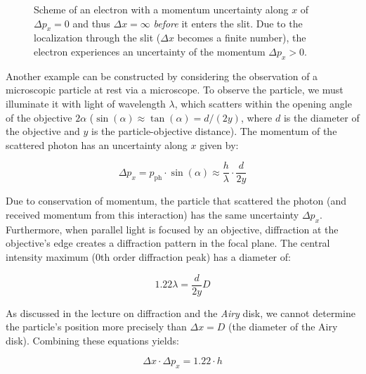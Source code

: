 \documentclass[
  a4paper,
]{book}
\begin{document}
\begin{tcolorbox}
\begin{figure}[H]
{}

\caption{Scheme of an electron with a momentum uncertainty along \(x\)
of \(\Delta p_x = 0\) and thus \(\Delta x = \infty\) \emph{before} it
enters the slit. Due to the localization through the slit (\(\Delta x\)
becomes a finite number), the electron experiences an uncertainty of the
momentum \(\Delta p_x > 0\).}

\end{figure}%

\end{tcolorbox}

\begin{tcolorbox}[enhanced jigsaw, coltitle=black, title=\textcolor{quarto-callout-note-color}{\faInfo}\hspace{0.5em}{Example: Uncertainty in a microscope}, colframe=quarto-callout-note-color-frame, toprule=.15mm, opacitybacktitle=0.6, left=2mm, opacityback=0, breakable, toptitle=1mm, bottomtitle=1mm, leftrule=.75mm, arc=.35mm, titlerule=0mm, colbacktitle=quarto-callout-note-color!10!white, rightrule=.15mm, bottomrule=.15mm, colback=white]

Another example can be constructed by considering the observation of a
microscopic particle at rest via a microscope. To observe the particle,
we must illuminate it with light of wavelength \(\lambda\), which
scatters within the opening angle of the objective \(2\alpha\)
(\(\sin(\alpha) \approx \tan(\alpha) = d/(2y)\), where \(d\) is the
diameter of the objective and \(y\) is the particle-objective distance).
The momentum of the scattered photon has an uncertainty along \(x\)
given by:

\[
\Delta p_x = p_{\mathrm{ph}} \cdot \sin(\alpha) \approx \frac{h}{\lambda} \cdot \frac{d}{2y}
\]

Due to conservation of momentum, the particle that scattered the photon
(and received momentum from this interaction) has the same uncertainty
\(\Delta p_x\). Furthermore, when parallel light is focused by an
objective, diffraction at the objective's edge creates a diffraction
pattern in the focal plane. The central intensity maximum (0th order
diffraction peak) has a diameter of:

\[
1.22\lambda = \frac{d}{2y}D
\]

As discussed in the lecture on diffraction and the \emph{Airy} disk, we
cannot determine the particle's position more precisely than
\(\Delta x = D\) (the diameter of the Airy disk). Combining these
equations yields:

\[
\Delta x \cdot \Delta p_x = 1.22 \cdot h
\]


\end{tcolorbox}
\end{document}
